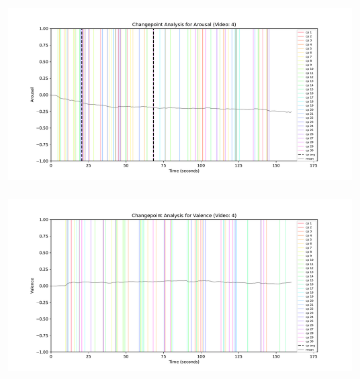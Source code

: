 \documentclass[11pt, letterpaper]{article}
\begin{document}
\begin{figure}
        \centering
    \begin{subfigure}[t]{0.49\textwidth}
        \centering
        \includegraphics[width=\linewidth]{changepoints_V4_arousal_avg} 
        \caption{} \label{fig:changepoints_V4_arousal_avg}
    \end{subfigure}
    \hfill
    \begin{subfigure}[t]{0.49\textwidth}
        \centering
        \includegraphics[width=\linewidth]{changepoints_V4_valence_avg} 
        \caption{} \label{fig:changepoints_V4_valence_avg}
    \end{subfigure}
 \end{figure}
\end{document}
